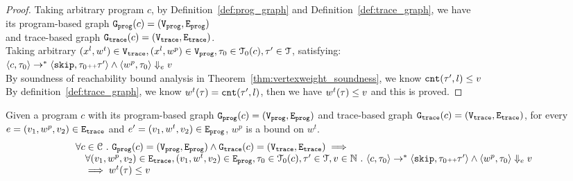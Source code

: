 \begin{proof}
Taking arbitrary program $c$,
by Definition~\ref{def:prog_graph} and Definition~\ref{def:trace_graph}, 
we have   
\\
its program-based graph $\mathtt{{G_{prog}}}({c}) = (\mathtt{{V_{prog}}}, \mathtt{{E_{prog}}})$ 
\\
and 
trace-based graph $\mathtt{{G_{trace}}}({c}) = (\mathtt{{V_{trace}}}, \mathtt{{E_{trace}}})$.
\\
Taking arbitrary 
$(x^l, w^{t}) \in \mathtt{{V_{trace}}}, (x^l, w^{p}) \in \mathtt{{V_{prog}}}, \mathtt{\tau}_0 \in \mathcal{T}_0(c), \mathtt{\tau}' \in \mathcal{T}$, satisfying:
\\
$\langle {c}, \mathtt{\tau}_0 \rangle \to^{*} \langle \mathtt{skip}, \mathtt{\tau}_0 {\scriptscriptstyle ++}\mathtt{\tau}' \rangle 
\land 
\langle w^{p}, \mathtt{\tau}_0 \rangle \Downarrow_e v$
\\
By soundness of reachability bound analysis in Theorem~\ref{thm:vertexweight_soundness}, we know 
$\mathtt{cnt}(\mathtt{\tau}', l) \leq v$
\\
By definition~\ref{def:trace_graph}, we know $w^t(\mathtt{\tau}) = \mathtt{cnt}(\mathtt{\tau}', l)$,
then we have $w^t(\mathtt{\tau}) \leq v$ and this is proved.
\end{proof}
%
\begin{lem}
	\label{lem:edgeweights_map}
	Given a program $c$ with its
	program-based graph $\mathtt{{G_{prog}}}({c}) = (\mathtt{{V_{prog}}}, \mathtt{{E_{prog}}})$
	and 
	trace-based graph $\mathtt{{G_{trace}}}({c}) = (\mathtt{{V_{trace}}}, \mathtt{{E_{trace}}})$,
	for every $e = (v_1, w^p, v_2) \in \mathtt{{E_{trace}}}$ and
	$e' = (v_1, w^t, v_2) \in \mathtt{{E_{prog}}}$, 
	$w^{p}$ is a bound on $w^t$.
	\[
		\begin{array}{l}
			\forall c \in \mathcal{C} 
			 ~.~ 
			 \mathtt{{G_{prog}}}({c}) = (\mathtt{{V_{prog}}}, \mathtt{{E_{prog}}})
			\land 
			\mathtt{{G_{trace}}}({c}) = (\mathtt{{V_{trace}}}, \mathtt{{E_{trace}}})
			\implies
			\\ \quad
			\forall (v_1, w^p, v_2) \in \mathtt{{E_{trace}}},
			(v_1, w^t, v_2) \in \mathtt{{E_{prog}}}, 
			\mathtt{\tau}_0 \in \mathcal{T}_0(c), 
			\mathtt{\tau}' \in \mathcal{T}, v \in \mathbb{N} ~.~
			\langle {c}, \mathtt{\tau}_0 \rangle \to^{*} \langle \mathtt{skip}, \mathtt{\tau}_0 {\scriptscriptstyle ++}\mathtt{\tau}' \rangle 
			\land 
			\langle w^{p}, \mathtt{\tau}_0 \rangle \Downarrow_e v
			\\ \quad
			\implies
			w^{t}(\mathtt{\tau}) \leq v
		\end{array}
		\]
	\end{lem}
